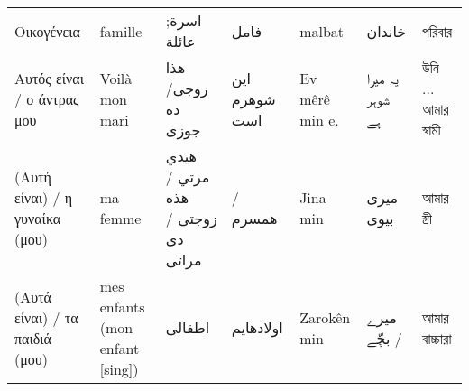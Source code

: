 \begin{longtable}{p{3.5cm} p{3.5cm} p{3.5cm} p{3.5cm} p{3.5cm} p{3.5cm} p{3.5cm} }
 Οικογένεια                                                                                                                    & famille                                                                                         & اسرة; عائلة                                                                           & فامل                                                        & malbat                                                                             & خاندان                                                                         & পরিবার                                                            \\
 Αυτός είναι  / ο άντρας μου                                                                                                   & Voilà mon mari                                                                                  & هذا زوجی/ دە جوزی                                                                     & این شوهرم است                                               & Ev mêrê min e.                                                                     & یہ میرا شوہر ہے                                                                & উনি ... আমার স্বামী                                               \\
 (Αυτή είναι)  / η γυναίκα (μου)                                                                                               & ma femme                                                                                        & هيدي مرتي / هذە زوجتی / دی مراتی                                                      & / همسرم                                                     & Jina min                                                                           & میری بیوی                                                                      & আমার স্ত্রী                                                       \\
 (Αυτά είναι) / τα παιδιά (μου)                                                                                                & mes enfants (mon enfant [sing])                                                                 & اطفالی                                                                                & اولادهایم                                                   & Zarokên min                                                                        & میرے بچّے  /                                                                   & আমার বাচ্চারা                                                     \\

\end{longtable}

